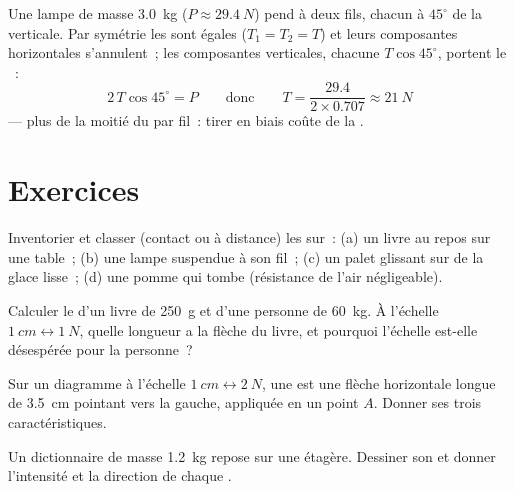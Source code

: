 \begin{example}\label{ex:g10:inertia:lamp}
Une lampe de masse \qty{3.0}{kg} ($P \approx \qty{29.4}{N}$) pend à
deux fils, chacun à $45^\circ$ de la verticale. Par symétrie les
 sont égales ($T_1 = T_2 = T$) et leurs composantes
horizontales s'annulent~; les composantes verticales, chacune
$T \cos 45^\circ$, portent le ~:
\[
2\,T \cos 45^\circ = P
\qquad\text{donc}\qquad
T = \frac{29.4}{2 \times 0.707} \approx \qty{21}{N}
\]
--- plus de la moitié du  par fil~: tirer en biais coûte
de la .
\end{example}

\section{Exercices}

\begin{exercise}[$\star$]\label{exo:g10:inertia:1}
Inventorier et classer (contact ou à distance) les
 sur~: (a) un livre au repos sur une table~; (b) une
lampe suspendue à son fil~; (c) un palet glissant sur de la glace
lisse~; (d) une pomme qui tombe (résistance de l'air négligeable).
\end{exercise}

\begin{exercise}[$\star$]\label{exo:g10:inertia:2}
Calculer le  d'un livre de \qty{250}{g} et d'une
personne de \qty{60}{kg}. À l'échelle
$\qty{1}{cm} \leftrightarrow \qty{1}{N}$, quelle longueur a la flèche
du livre, et pourquoi l'échelle est-elle désespérée pour la personne~?
\end{exercise}

\begin{exercise}[$\star$]\label{exo:g10:inertia:3}
Sur un diagramme à l'échelle $\qty{1}{cm} \leftrightarrow \qty{2}{N}$,
une  est une flèche horizontale longue de \qty{3.5}{cm}
pointant vers la gauche, appliquée en un point $A$. Donner ses trois
caractéristiques.
\end{exercise}

\begin{exercise}[$\star$]\label{exo:g10:inertia:4}
Un dictionnaire de masse \qty{1.2}{kg} repose sur une étagère. Dessiner
son  et donner l'intensité et la
direction de chaque .
\end{exercise}

